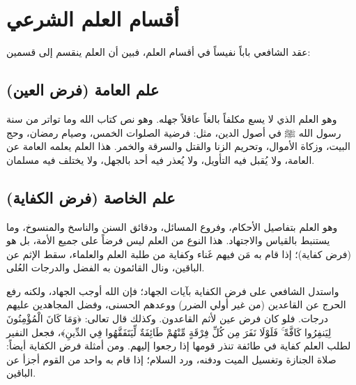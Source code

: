 \section{أقسام العلم الشرعي}
عقد الشافعي باباً نفيساً في أقسام العلم، فبين أن العلم ينقسم إلى قسمين:

\subsection{علم العامة (فرض العين)}
وهو العلم الذي لا يسع مكلفاً بالغاً عاقلاً جهله. وهو نص كتاب الله وما تواتر من سنة رسول الله ﷺ في أصول الدين، مثل: فرضية الصلوات الخمس، وصيام رمضان، وحج البيت، وزكاة الأموال، وتحريم الزنا والقتل والسرقة والخمر. 
هذا العلم يعلمه العامة عن العامة، ولا يُقبل فيه التأويل، ولا يُعذر فيه أحد بالجهل، ولا يختلف فيه مسلمان.

\subsection{علم الخاصة (فرض الكفاية)}
وهو العلم بتفاصيل الأحكام، وفروع المسائل، ودقائق السنن والناسخ والمنسوخ، وما يستنبط بالقياس والاجتهاد.
هذا النوع من العلم ليس فرضاً على جميع الأمة، بل هو (فرض كفاية)؛ إذا قام به مَن فيهم غَناء وكفاية من طلبة العلم والعلماء، سقط الإثم عن الباقين، ونال القائمون به الفضل والدرجات العُلى.

واستدل الشافعي على فرض الكفاية بآيات الجهاد؛ فإن الله أوجب الجهاد، ولكنه رفع الحرج عن القاعدين (من غير أولي الضرر) ووعدهم الحسنى، وفضل المجاهدين عليهم درجات. فلو كان فرض عين لأثم القاعدون. وكذلك قال تعالى: ﴿وَمَا كَانَ الْمُؤْمِنُونَ لِيَنفِرُوا كَافَّةً ۚ فَلَوْلَا نَفَرَ مِن كُلِّ فِرْقَةٍ مِّنْهُمْ طَائِفَةٌ لِّيَتَفَقَّهُوا فِي الدِّينِ﴾، فجعل النفير لطلب العلم كفاية في طائفة تنذر قومها إذا رجعوا إليهم.
ومن أمثلة فرض الكفاية أيضاً: صلاة الجنازة وتغسيل الميت ودفنه، ورد السلام؛ إذا قام به واحد من القوم أجزأ عن الباقين.